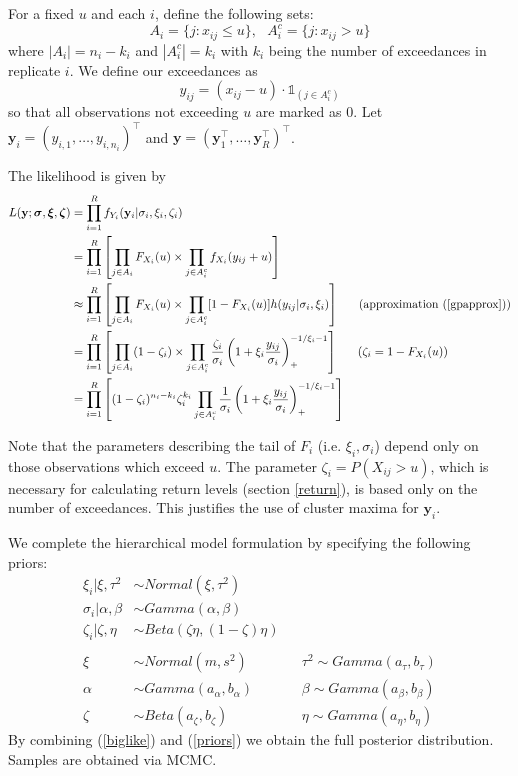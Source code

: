 \documentclass[12pt]{article}
\newcommand{\m}[1]{\mathbf{\bm{#1}}}
\newcommand{\ind}{\mathds{1}}
\begin{document}
For a fixed $u$ and each $i$, define the following sets:
\[ A_i = \{j:x_{ij}\leq u\},~~~ A_i^c = \{j: x_{ij}>u\} \]
where $|A_i|=n_i-k_i$ and $|A_i^c|=k_i$ with $k_i$ being the number of exceedances in replicate $i$. We define our exceedances as
\[ y_{ij} = (x_{ij}-u)\cdot \ind_{(j \in A_i^c)} \]
so that all observations not exceeding $u$ are marked as $0$. Let $\m{y}_i=(y_{i,1},\ldots,y_{i,n_i})^\top$ and $\m{y}=(\m{y}_1^\top,\ldots,\m{y}_R^\top)^\top$.

The likelihood is given by
\begin{align}
L(\m{y}; \m{\sigma}, \m{\xi}, \m{\zeta}) &= \prod_{i=1}^R f_{Y_i}(\m{y}_i|\sigma_i,\xi_i,\zeta_i) \nonumber \\
&= \prod_{i=1}^R\left[\prod_{j\in A_i} F_{X_i}(u) \times \prod_{j\in A_i^c} f_{X_i}(y_{ij}+u)\right] \nonumber \\
&\approx \prod_{i=1}^R\left[\prod_{j\in A_i} F_{X_i}(u) \times \prod_{j\in A_i^c} [1-F_{X_i}(u)]h(y_{ij}|\sigma_i,\xi_i)\right]~~~~~\mathrm{(approximation~(\ref{gpapprox}))} \nonumber \\
&= \prod_{i=1}^R\left[\prod_{j\in A_i} (1-\zeta_i)\times \prod_{j\in A_i^c} \frac{\zeta_i}{\sigma_i}\left(1+\xi_i\frac{y_{ij}}{\sigma_i}\right)_+^{-1/\xi_i-1}\right]~~~~~(\zeta_i=1-F_{X_i}(u)) \nonumber \\
&= \prod_{i=1}^R\left[(1-\zeta_i)^{n_i-k_i}\zeta_i^{k_i}\prod_{j\in A_i^c}\frac{1}{\sigma_i}\left(1+\xi_i\frac{y_{ij}}{\sigma_i}\right)_+^{-1/\xi_i-1}\right] \label{biglike}
\end{align}

Note that the parameters describing the tail of $F_i$ (i.e. $\xi_i,\sigma_i$) depend only on those observations which exceed $u$. The parameter $\zeta_i=P(X_{ij}>u)$, which is necessary for calculating return levels (section \ref{return}), is based only on the number of exceedances. This justifies the use of cluster maxima for $\m{y}_i$.

We complete the hierarchical model formulation by specifying the following priors:
\begin{align}
\xi_i|\xi, \tau^2  &\sim Normal(\xi, \tau^2) \nonumber \\
\sigma_i|\alpha, \beta &\sim Gamma(\alpha, \beta) \nonumber \\
\zeta_i|\zeta, \eta &\sim Beta(\zeta\eta, (1-\zeta)\eta) \nonumber \\
 \label{priors} \\
\xi &\sim Normal(m, s^2)&  &\tau^2 \sim Gamma(a_\tau, b_\tau) \nonumber \\
\alpha &\sim Gamma(a_\alpha, b_\alpha)&  &\beta \sim Gamma(a_\beta, b_\beta) \nonumber \\
\zeta &\sim Beta(a_\zeta, b_\zeta)&  &\eta \sim Gamma(a_\eta, b_\eta) \nonumber
\end{align}
By combining (\ref{biglike}) and (\ref{priors}) we obtain the full posterior distribution. Samples are obtained via MCMC.
\end{document}
